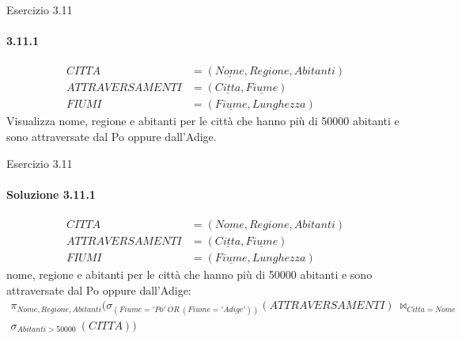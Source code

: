 \def\schemaEx3.11{\small \begin{align*}
    CITTA &= (\underline{Nome}, Regione, Abitanti)\\
    ATTRAVERSAMENTI &= (\underline{Citta}, \underline{Fiume})\\
    FIUMI &= (\underline{Fiume}, Lunghezza)
    \end{align*}}
\begin{frame}{Esercizio 3.11}
    \framesubtitle{3.11.1}
    \schemaEx3.11
    Visualizza nome, regione e abitanti per le citt\`a che hanno pi\`u di 50000 abitanti e sono attraversate dal Po oppure dall'Adige.
\end{frame}
%
\begin{frame}{Esercizio 3.11}
    \framesubtitle{Soluzione 3.11.1}
    \vspace*{-1.2cm}
    \schemaEx3.11
    {\small nome, regione e abitanti per le citt\`a che hanno pi\`u di 50000 abitanti e sono attraversate dal Po oppure dall'Adige:}
    \small
    \begin{gather*}
        \pi_{Nome,Regione,Abitanti} (\sigma_{(Fiume='Po'~OR~(Fiume='Adige'))} (ATTRAVERSAMENTI)~\bowtie_{Citta=Nome}\\
        \sigma_{Abitanti>50000}~(CITTA))
    \end{gather*}
\end{frame}